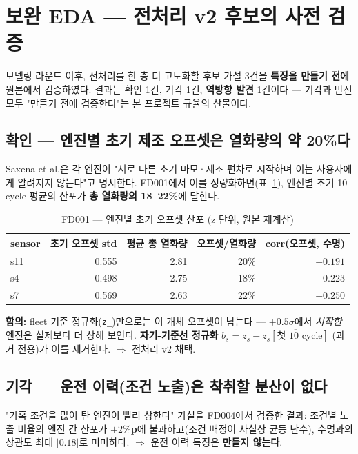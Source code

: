 \documentclass[11pt]{article}
\begin{document}
\section{보완 EDA — 전처리 v2 후보의 사전 검증}
\label{sec:eda-v2}

모델링 라운드 이후, 전처리를 한 층 더 고도화할 후보 가설 3건을 \textbf{특징을 만들기 전에} 원본에서 검증하였다.
결과는 확인 1건, 기각 1건, \textbf{역방향 발견} 1건이다 — 기각과 반전 모두 "만들기 전에 검증한다"는 본 프로젝트 규율의 산물이다.

\subsection{확인 — 엔진별 초기 제조 오프셋은 열화량의 약 20\%다}

Saxena et al.은 각 엔진이 "서로 다른 초기 마모·제조 편차로 시작하며 이는 사용자에게 알려지지 않는다"고 명시한다.
FD001에서 이를 정량화하면(표~\ref{tab:offset}), 엔진별 초기 10 cycle 평균의 산포가 \textbf{총 열화량의 18--22\%}에 달한다.

\begin{table}[H]
\centering
\caption{FD001 — 엔진별 초기 오프셋 산포 (z 단위, 원본 재계산)}
\label{tab:offset}
\begin{tabular}{lrrrr}
\toprule
sensor & 초기 오프셋 std & 평균 총 열화량 & 오프셋/열화량 & corr(오프셋, 수명) \\
\midrule
s11 & 0.555 & 2.81 & 20\% & $-0.191$ \\
s4  & 0.498 & 2.75 & 18\% & $-0.223$ \\
s7  & 0.569 & 2.63 & 22\% & $+0.250$ \\
\bottomrule
\end{tabular}
\end{table}

\textbf{함의:} fleet 기준 정규화(\texttt{z\_})만으로는 이 개체 오프셋이 남는다 — $+0.5\sigma$에서 \emph{시작한} 엔진은 실제보다 더 상해 보인다.
\textbf{자기-기준선 정규화} $b_s = z_s - \overline{z_s[\text{첫 }10\text{ cycle}]}$ (과거 전용)가 이를 제거한다. $\Rightarrow$ 전처리 v2 채택.

\subsection{기각 — 운전 이력(조건 노출)은 착취할 분산이 없다}

"가혹 조건을 많이 탄 엔진이 빨리 상한다" 가설을 FD004에서 검증한 결과:
조건별 노출 비율의 엔진 간 산포가 \textbf{$\pm2\%$p}에 불과하고(조건 배정이 사실상 균등 난수), 수명과의 상관도 최대 $|0.18|$로 미미하다.
$\Rightarrow$ 운전 이력 특징은 \textbf{만들지 않는다}.
\end{document}
